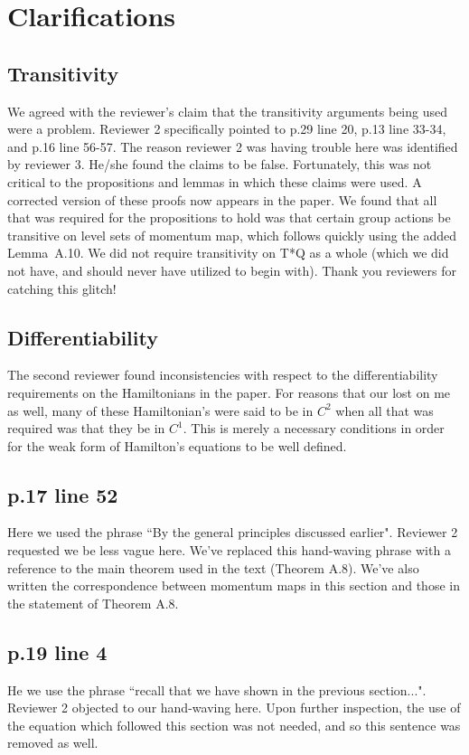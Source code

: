 \documentclass{article}
\begin{document}
\section{Clarifications}

\subsection{Transitivity}
We agreed with the reviewer's claim that the transitivity arguments being used were a problem.  Reviewer 2 specifically pointed to p.29 line 20, p.13 line 33-34, and
p.16 line 56-57.
The reason reviewer 2 was having trouble here was identified by reviewer 3.  He/she found the claims to be false.  Fortunately, this was not critical to the propositions and lemmas in which these claims were used.  A corrected version of these proofs now appears in the paper.  We found that all that was required for the propositions to hold was that certain group actions be transitive on level sets of momentum map, which follows quickly using the added Lemma~A.10. We did not require transitivity on T*Q as a whole (which we did not have, and should never have utilized to begin with). Thank you reviewers for catching this glitch!

\subsection{Differentiability}
The second reviewer found inconsistencies with respect to the differentiability requirements on the Hamiltonians in the paper.
For reasons that our lost on me as well, many of these Hamiltonian's were said to be in $C^{2}$ when all that was required was that they be in $C^{1}$.
This is merely a necessary conditions in order for the weak form of Hamilton's equations to be well defined.

\subsection{p.17 line 52}
 Here we used the phrase ``By the general principles discussed earlier".
 Reviewer 2 requested we be less vague here.  We've replaced this hand-waving phrase with a reference to the main theorem used in the text (Theorem A.8).  We've also written the correspondence between momentum maps in this section and those in the statement of Theorem A.8.

\subsection{p.19 line 4}
He we use the phrase ``recall that we have shown in the previous section...". 
Reviewer 2 objected to our hand-waving here.
Upon further inspection, the use of the equation which followed this section was not needed, and so this sentence was removed as well.
\end{document}

